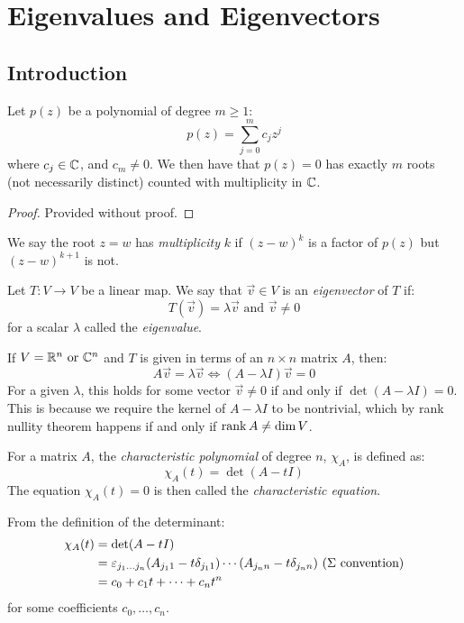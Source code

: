 \documentclass[../main.tex]{subfiles}
\begin{document}
\chapter{Eigenvalues and Eigenvectors}
\section{Introduction}
\begin{theorem}
  Let $p(z)$ be a polynomial of degree $m \geq 1$: \label{FTA}
  \[
    p(z) = \sum_{j = 0}^{m}  c_jz^{j}
  \]
  where $c_j \in \mathbb{C}$, and $c_m \neq 0$.
  We then have that $p(z) = 0$ has exactly $m$ roots (not necessarily distinct) counted with multiplicity in $\mathbb{C}$.
\end{theorem}
\begin{proof}
  Provided without proof.
\end{proof}
\begin{definition}[Multiplicity]
  We say the root $z = w$ has \textit{multiplicity} $k$ if $(z - w)^{k}$ is a factor of $p(z)$ but $(z - w)^{k + 1}$ is not.
\end{definition}
\begin{definition}
  Let $T: V \to V$ be a linear map.
  We say that $\vec{v} \in V$ is an \textit{eigenvector} of $T$ if:
  \[
    T(\vec{v}) = \lambda \vec{v} \text{ and } \vec{v} \neq 0
  \]
  for a scalar $\lambda$ called the \textit{eigenvalue}.
\end{definition}
If $V = \mathbb{R}^{n} \text{ or } \mathbb{C}^{n}$ and $T$ is given in terms of an $n \times n$ matrix $A$, then:
\[
  A\vec{v} = \lambda \vec{v} \iff (A - \lambda I)\vec{v} = 0
\]
For a given $\lambda$, this holds for some vector $\vec{v} \neq 0$ if and only if $\det (A - \lambda I) = 0$.
This is because we require the kernel of $A - \lambda I$ to be nontrivial, which by rank nullity theorem happens if and only if $\operatorname{rank} A \neq \dim V$.
\begin{definition}
  For a matrix $A$, the \textit{characteristic polynomial} of degree $n$, $\chi_A$, is defined as:
  \[
    \chi_A(t) = \det (A - t I)
  \]
  The equation $\chi_A(t) = 0$ is then called the \textit{characteristic equation}.
\end{definition}
From the definition of the determinant:
\begin{align*}
  \chi_A(t) &= \det (A - tI) \\
            &= \varepsilon_{j_1 \ldots j_n}(A_{j_1 1} - t\delta_{j_1 1}) \cdots (A_{j_n n} - t\delta_{j_n n}) \text{ ($\Sigma$ convention)} \\
            &= c_0 + c_1 t + \cdots + c_n t^{n}
\end{align*}
for some coefficients $c_0, \ldots, c_n$.
\end{document}
